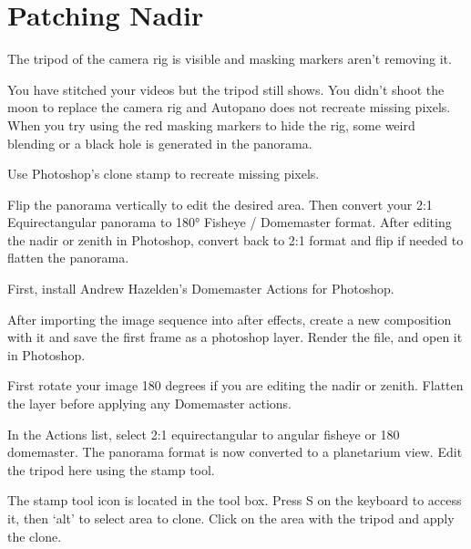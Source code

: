 \chapter{Patching Nadir}
\pagecolor{white}
\label{chap:48}
\begin{fullwidth}

\problem

{\large The tripod of the camera rig is visible and masking markers aren’t removing it. \par}

You have stitched your videos but the tripod still shows. You didn't shoot the moon to replace the camera rig and Autopano does not recreate missing pixels. When you try using the red masking markers to hide the rig, some weird blending or a black hole is generated in the panorama.

\solution

{\large Use Photoshop’s clone stamp to recreate missing pixels. \par}

Flip the panorama vertically to edit the desired area. Then convert your 2:1 Equirectangular panorama to 180° Fisheye / Domemaster format. After editing the nadir or zenith in Photoshop, convert back to 2:1 format and flip if needed to flatten the panorama.

First, install Andrew Hazelden's Domemaster Actions for Photoshop.

\clearpage

After importing the image sequence into after effects, create a new composition with it and save the first frame as a photoshop layer. Render the file, and open it in Photoshop.


First rotate your image 180 degrees if you are editing the nadir or zenith. Flatten the layer before applying any Domemaster actions.


In the Actions list, select 2:1 equirectangular to angular fisheye or 180 domemaster. The panorama format is now converted to a planetarium view. Edit the tripod here using the stamp tool.

\tip The stamp tool icon is located in the tool box. Press S on the keyboard to access it, then ‘alt’ to select area to clone. Click on the area with the tripod and apply the clone.



\end{fullwidth}
